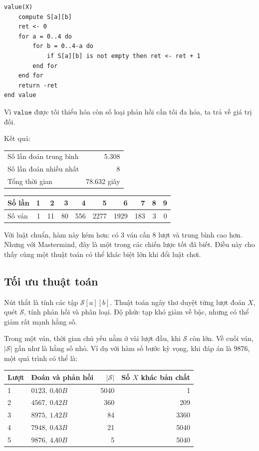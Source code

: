 \documentclass[11pt]{article}
\newcommand{\AB}[2]{#1A#2B}
\newcommand{\SetS}{\mathcal{S}}
\begin{document}
\begin{verbatim}
value(X)
    compute S[a][b]
    ret <- 0
    for a = 0..4 do
        for b = 0..4-a do
            if S[a][b] is not empty then ret <- ret + 1
        end for
    end for
    return -ret
end value
\end{verbatim}
Vì \(\texttt{value}\) được tối thiểu hóa còn số loại phản hồi cần tối đa hóa,
ta trả về giá trị đối.

Kết quả:
\begin{center}
\small
\begin{tabular}{|l|r|}
\hline
Số lần đoán trung bình & 5.308 \\
Số lần đoán nhiều nhất & 8 \\
Tổng thời gian & 78.632 giây \\
\hline
\end{tabular}

\medskip
\begin{tabular}{|l|rrrrrrrrr|}
\hline
Số lần & 1 & 2 & 3 & 4 & 5 & 6 & 7 & 8 & 9 \\
\hline
Số ván & 1 & 11 & 80 & 556 & 2277 & 1929 & 183 & 3 & 0 \\
\hline
\end{tabular}
\end{center}

Với luật chuẩn, hàm này kém hơn: có \(3\) ván cần \(8\) lượt và trung bình cao
hơn. Nhưng với Mastermind, đây là một trong các chiến lược tốt đã biết. Điều
này cho thấy cùng một thuật toán có thể khác biệt lớn khi đổi luật chơi.

\subsection{Tối ưu thuật toán}

Nút thắt là tính các tập \(\SetS[a][b]\). Thuật toán ngây thơ duyệt từng lượt
đoán \(X\), quét \(\SetS\), tính phản hồi và phân loại. Độ phức tạp khó giảm
về bậc, nhưng có thể giảm rất mạnh hằng số.

Trong một ván, thời gian chủ yếu nằm ở vài lượt đầu, khi \(\SetS\) còn lớn.
Về cuối ván, \(|\SetS|\) gần như là hằng số nhỏ. Ví dụ với hàm số bước kỳ
vọng, khi đáp án là \(9876\), một quá trình có thể là:
\begin{center}
\small
\begin{tabular}{|l|l|r|r|}
\hline
Lượt & Đoán và phản hồi & \(|\SetS|\) & Số \(X\) khác bản chất \\
\hline
1 & \(0123,\ \AB{0}{0}\) & 5040 & 1 \\
2 & \(4567,\ \AB{0}{2}\) & 360 & 209 \\
3 & \(8975,\ \AB{1}{2}\) & 84 & 3360 \\
4 & \(7948,\ \AB{0}{3}\) & 21 & 5040 \\
5 & \(9876,\ \AB{4}{0}\) & 5 & 5040 \\
\hline
\end{tabular}
\end{center}
\end{document}
